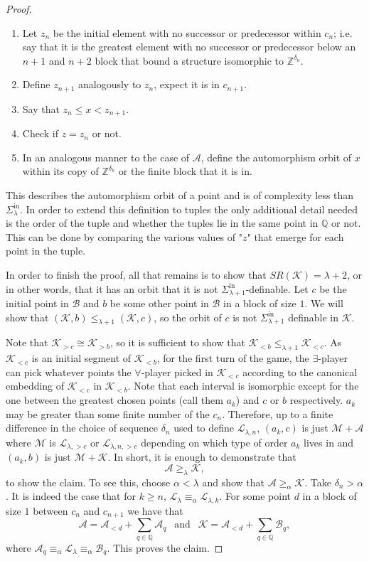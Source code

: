 \documentclass[10pt,a4paper]{amsart}
\providecommand{\A}{\mathcal{A}}
\providecommand{\L}{\mathcal{L}}
\providecommand{\B}{\mathcal{B}}
\providecommand{\M}{\mathcal{M}}
\providecommand{\Sinf}[1]{\Sigma^{\mathrm{in}}_{#1}}
\newcommand{\SR}{SR}
\newcommand{\Q}{\mathbb{Q}}
\newcommand{\Z}{\mathbb{Z}}
\newcommand{\K}{\mathcal{K}}
\renewcommand{\L}{\mathcal{L}}
\begin{document}
\begin{proof}
\begin{enumerate}
    \item Let $z_n$ be the initial element with no successor or predecessor
        within $c_n$; i.e. say that it is the greatest element with no successor
        or predecessor below an $n+1$ and $n+2$ block that bound a structure
        isomorphic to $\Z^{\delta_n}$.

    \item Define $z_{n+1}$ analogously to $z_n$, expect it is in $c_{n+1}.$
    \item Say that $z_n\leq x<z_{n+1}$.
    \item Check if $z=z_n$ or not.

    \item In an analogous manner to the case of $\A$, define the automorphism
        orbit of $x$ within its copy of $\Z^{\delta_k}$ or the finite
        block that it is in.

\end{enumerate}

This describes the automorphism orbit of a point and is of complexity less than
$\Sinf{\lambda}$. In order to extend this definition to tuples the only
additional detail needed is the order of the tuple and whether the tuples lie in the same point in $\Q$ or not. This can be done by comparing the various values of "$z$" that emerge for each point in the tuple.

In order to finish the proof, all that remains is to show that
$\SR(\K)=\lambda+2$, or in other words, that it has an orbit that it is not
$\Sinf{\lambda+1}$-definable. Let $c$ be the initial point in $\B$ and $b$ be
some other point in $\B$ in a block of size $1$. We will show that 
$(\K,b)\leq_{\lambda+1}(\K,c)$, so the orbit of $c$ is not $\Sinf{\lambda+1}$
definable in $\K$.

Note that $\K_{>c}\cong \K_{>b}$, so it is sufficient to show that
$\K_{<b}\leq_{\lambda+1} \K_{<c}.$
As $\K_{<c}$ is an initial segment of $\K_{<b}$, for the first turn of the game,
the $\exists$-player can pick whatever points the $\forall$-player picked in
$\K_{<c}$ according to the canonical embedding of $\K_{<c}$ in $\K_{<b}$.
Note that each interval is isomorphic except for the one between the greatest chosen points (call them $a_k$) and $c$ or $b$ respectively. 
$a_k$ may be greater than some finite number of the $c_n$. 
Therefore, up to a finite difference in the choice of sequence $\delta_n$ used
to define $\L_{\lambda,n}$, $(a_k,c)$ is just $\M+\A$ where $\M$ is
$\L_{\lambda,>c}$ or $\L_{\lambda,n,>c}$ depending on which type of order $a_k$
lives in and $(a_k,b)$ is just $\M+\K$.
In short, it is enough to demonstrate that
$$\A\geq_\lambda \K,$$
to show the claim.
To see this, choose $\alpha<\lambda$ and show that
$\A\geq_\alpha \K.$
Take $\delta_n>\alpha$. It is indeed the case that for $k\geq n$,
$\L_{\lambda}\equiv_\alpha \L_{\lambda,k}$. For some point $d$ in a block of
size $1$ between $c_n$ and $c_{n+1}$ we have that
\[\A=\A_{<d}+\sum_{q\in\Q} \A_q~~ \text{ and } ~~ \K=\A_{<d}+\sum_{q\in\Q} \B_q,\]
where $\A_q\equiv_\alpha \L_{\lambda}\equiv_\alpha \B_q$. This proves the claim.
\end{proof}
\end{document}
